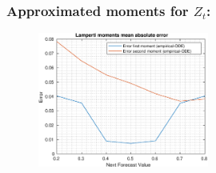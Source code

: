 \documentclass[aspectratio=169]{beamer}\usepackage[utf8]{inputenc}
\begin{document}
\begin{frame}\frametitle{Approximated moments for $Z_t$:}

\begin{figure}[ht!]
\centering
\includegraphics[width=0.5\textwidth]{../../MATLAB_Files/Results/moments/lamperti/7.eps}
\end{figure}

\end{frame}
\end{document}
